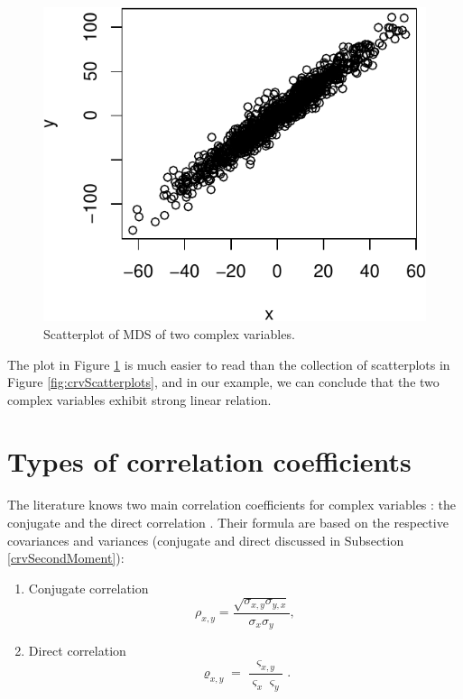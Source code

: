 \documentclass[
]{book}
\begin{document}
\begin{figure}
\centering
\includegraphics{Svetunkov---Svetunkov---Complex-Valued-Econometrics_files/figure-latex/crvScatterplotMDS-1.pdf}
\caption{\label{fig:crvScatterplotMDS}Scatterplot of MDS of two complex variables.}
\end{figure}

The plot in Figure \ref{fig:crvScatterplotMDS} is much easier to read than the collection of scatterplots in Figure \ref{fig:crvScatterplots}, and in our example, we can conclude that the two complex variables exhibit strong linear relation.

\hypertarget{correlationTypes}{%
\section{Types of correlation coefficients}\label{correlationTypes}}

The literature knows two main correlation coefficients for complex variables \citep{Schreier2010}: the conjugate and the direct correlation \citep[the latter is known in the literature as ``pseudo-correlation'', see, for example,][]{Chung2020}. Their formula are based on the respective covariances and variances (conjugate and direct discussed in Subsection \ref{crvSecondMoment}):

\begin{enumerate}
\def\labelenumi{\arabic{enumi}.}
\item
  Conjugate correlation
  \begin{equation}
   \rho_{x,y} = \frac{\sqrt{\sigma_{x,y} \sigma_{y,x}}}{\sigma_x \sigma_y},
   \label{eq:correlationConjugate}
  \end{equation}
\item
  Direct correlation
  \begin{equation}
   \varrho_{x,y} = \frac{\varsigma_{x,y}}{\varsigma_x \varsigma_y}.
   \label{eq:correlationDirect}
  \end{equation}
\end{enumerate}
\end{document}
